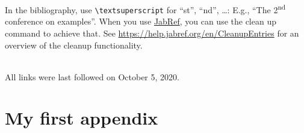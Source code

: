\documentclass[
  numbers=noenddot,
  english,  %
  a4paper,  %
  twoside,  %
  bibliography=totoc,
  headsepline,
  cleardoublepage=empty,
  parskip=half,
  draft=false
]{scrbook}
\theoremstyle{break}
\begin{document}
In the bibliography, use \texttt{\textbackslash textsuperscript} for \enquote{st}, \enquote{nd}, \ldots:
E.g., \enquote{The 2\textsuperscript{nd} conference on examples}.
When you use \href{https://www.jabref.org}{JabRef}, you can use the clean up command to achieve that.
See \url{https://help.jabref.org/en/CleanupEntries} for an overview of the cleanup functionality.

\printbibliography

\ \\
%
\noindent
All links were last followed on October 5, 2020.



\clearpage
\appendix

\chapter{My first appendix}\label{sec:appendix1}

\lipsum[1]

\pagestyle{empty}
\renewcommand*{\chapterpagestyle}{empty}
\Versicherung
\end{document}
